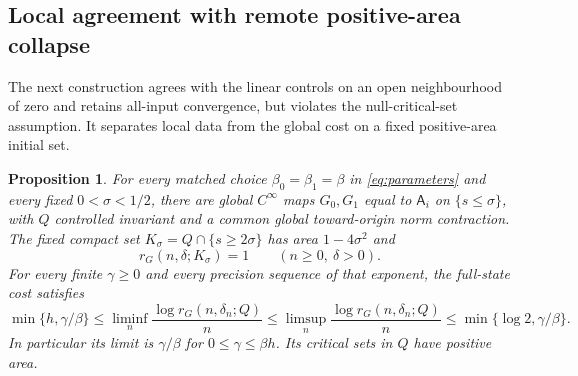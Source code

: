 \documentclass[11pt]{amsart}
\newtheorem{proposition}[theorem]{Proposition}
\theoremstyle{definition}
\theoremstyle{remark}
\numberwithin{equation}{section}
\begin{document}
\subsection{Local agreement with remote positive-area collapse}
\label{sec:collapse}
The next construction agrees with the linear controls on an open
neighbourhood of zero and retains all-input convergence, but violates
the null-critical-set assumption. It separates local data from the
global cost on a fixed positive-area initial set.
\begin{proposition}\label{prop:collapse}
For every matched choice $\beta_0=\beta_1=\beta$ in
\eqref{eq:parameters} and every fixed $0<\sigma<1/2$, there
are global $C^\infty$ maps $G_0,G_1$ equal to $\mathsf A_i$
on $\{s\le\sigma\}$, with $Q$ controlled invariant and a
common global toward-origin norm contraction. The fixed compact set
$K_\sigma=Q\cap\{s\ge2\sigma\}$ has area $1-4\sigma^2$ and
\begin{equation}\label{eq:collapseone}
r_G(n,\delta;K_\sigma)=1\qquad(n\ge0,\ \delta>0).
\end{equation}
For every finite $\gamma\ge0$ and every precision sequence of
that exponent, the full-state cost satisfies
\begin{equation}\label{eq:collapsebounds}
\min\{h,\gamma/\beta\}
\le\liminf_n\frac{\log r_G(n,\delta_n;Q)}n
\le\limsup_n\frac{\log r_G(n,\delta_n;Q)}n
\le\min\{\log2,\gamma/\beta\}.
\end{equation}
In particular its limit is $\gamma/\beta$ for
$0\le\gamma\le\beta h$. Its critical sets in $Q$ have positive area.
\end{proposition}
\end{document}
